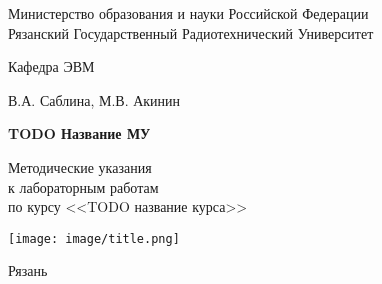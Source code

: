 
\begin{titlepage}

\begin{center}

Министерство образования и науки Российской Федерации \\
Рязанский Государственный Радиотехнический Университет

\bigskip

Кафедра ЭВМ

\vspace{5em}

В.А. Саблина, М.В. Акинин

\vspace{3em}

{\Large \bf TODO Название МУ}

\bigskip

Методические указания\\
к лабораторным работам\\
по курсу <<TODO название курса>>

\vfill

\texttt{[image: image/title.png]}

\vfill

Рязань \the\year

\end{center}

\thispagestyle{empty}

\end{titlepage}

\setcounter{page}{2}

\newpage

